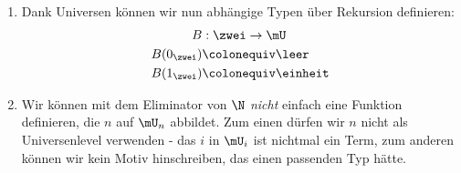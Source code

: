 \begin{beispiel}
\begin{enumerate}[()]
\item Dank Universen können wir nun abhängige Typen über Rekursion definieren:
  \begin{align*}
    B&:\zwei\to\mU \\
    B(0_{\zwei})&\colonequiv \leer \\
    B(1_{\zwei})&\colonequiv \einheit
  \end{align*}
\item Wir können mit dem Eliminator von $\N$ \emph{nicht} einfach eine Funktion definieren,
  die $n$ auf $\mU_n$ abbildet. Zum einen dürfen wir $n$ nicht als Universenlevel verwenden -
  das $i$ in $\mU_i$ ist nichtmal ein Term, zum anderen können wir kein Motiv hinschreiben,
  das einen passenden Typ hätte.
\end{enumerate}
\end{beispiel}
